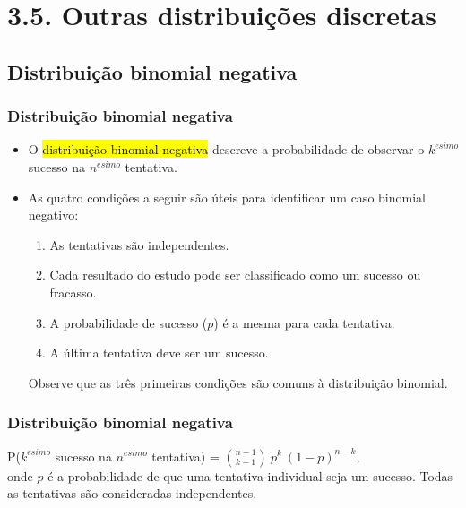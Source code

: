 
\section{3.5. Outras distribuições discretas}


\subsection{Distribuição binomial negativa}


\begin{frame}
\frametitle{Distribuição binomial negativa}

\begin{itemize}
\justifying
\item O \hl{distribuição binomial negativa} descreve a probabilidade de observar o $ k ^ {esimo} $ sucesso na $ n ^ {esimo} $ tentativa.
\justifying
\item As quatro condições a seguir são úteis para identificar um caso binomial negativo:
\begin{enumerate}
\justifying
\item As tentativas são independentes.
\justifying
\item Cada resultado do estudo pode ser classificado como um sucesso ou fracasso.
\justifying
\item A probabilidade de sucesso ($ p $) é a mesma para cada tentativa.
\justifying
\item A última tentativa deve ser um sucesso.
\end{enumerate}
\justifying
Observe que as três primeiras condições são comuns à distribuição binomial.

\end{itemize}
\end{frame}


\begin{frame}
\frametitle{Distribuição binomial negativa}

\vfill

\justifying
{}
{
P($k^{esimo}$ sucesso na $n^{esimo}$ tentativa) = ${n-1 \choose k-1}~p^k~(1-p)^{n-k}$, \\
\justifying
onde $ p $ é a probabilidade de que uma tentativa individual seja um sucesso. Todas as tentativas são consideradas independentes.
}

\end{frame}

